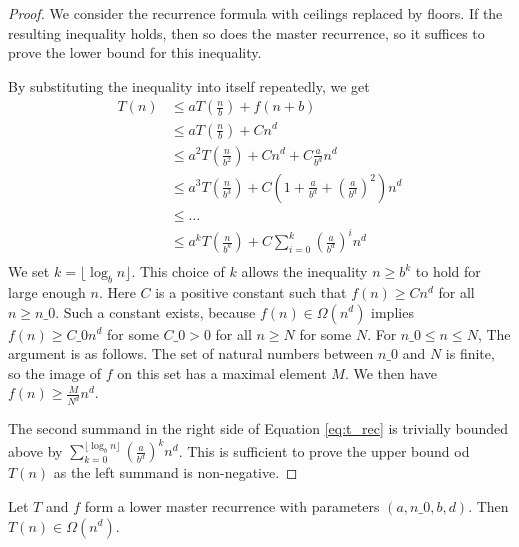 \begin{proof}
    \leanok
    We consider the recurrence formula with ceilings replaced by floors. If the
    resulting inequality holds, then so does the master recurrence, so it 
    suffices to prove the lower bound for this inequality.

    By substituting the inequality into itself repeatedly, we get
    \begin{align}
        \label{eq:t_rec}
        T(n) &\leq a T(\frac{n}{b}) + f(n + b) \\
             &\leq a T(\frac{n}{b}) + C n^d \\
             &\leq a^2 T(\frac{n}{b^2}) + C n^d + C \frac{a}{b^d} n^d \\
             &\leq a^3 T(\frac{n}{b^3}) + C (1 + \frac{a}{b^d} + 
                                            (\frac{a}{b^d})^2) n^d \\
             &\leq \dots \\
             &\leq a^k T(\frac{n}{b^k}) + C \sum_{i=0}^k 
                                                    (\frac{a}{b^d})^i n^d \\
    \end{align}
    We set $k = \lfloor \log_b{n} \rfloor$. This choice of $k$ allows the 
    inequality $n \geq b^k$ to hold for large enough $n$. Here $C$ is a 
    positive constant such that $f(n) \geq C n^d$ for all $n \geq n\_0$. 
    Such a constant exists, because $f(n) \in \Omega(n^d)$ implies
    $f(n) \geq C\_0 n^d$ for some $C\_0 > 0$ for all $n \geq N$ for some $N$.
    For $n\_0 \leq n \leq N$, The argument is as follows. The set of natural 
    numbers between $n\_0$ and $N$ is finite, so the image of $f$ on this
    set has a maximal element $M$. We then have $f(n) \geq \frac{M}{N^d} n^d$.

    The second summand in the right side of Equation \ref{eq:t_rec} is
    trivially bounded above by 
    $\sum_{k=0}^{\lfloor \log_b{n} \rfloor} (\frac{a}{b^d})^k n^d$. This is 
    sufficient to prove the upper bound od $T(n)$ as the left summand is 
    non-negative.
\end{proof}

\begin{lemma}
    \label{lemma:big_omega_pow}
    \leanok
    Let $T$ and $f$ form a lower master recurrence with parameters 
    $(a, n\_0, b, d)$. Then $T(n) \in \Omega(n^d)$.
\end{lemma}

